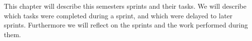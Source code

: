 This chapter will describe this semesters sprints and their tasks. We will describe which tasks were completed during a sprint, and which were delayed to later sprints. Furthermore we will reflect on the sprints and the work performed during them.
